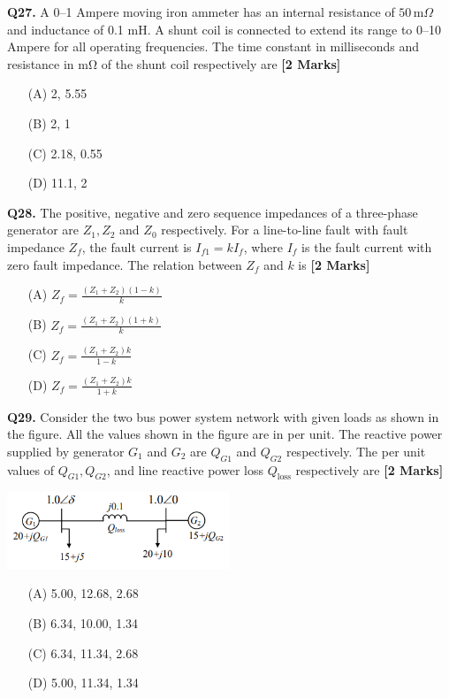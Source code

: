 \documentclass[11pt]{article}
\newcommand{\questionb}[2]{
    \noindent\textbf{Q#2.} #1 \hfill \textbf{[2 Marks]}
}
\begin{document}
\questionb{A 0–1 Ampere moving iron ammeter has an internal resistance of \( 50 \, \text{m}\Omega \) and inductance of 0.1 mH. A shunt coil is connected to extend its range to 0–10 Ampere for all operating frequencies. The time constant in milliseconds and resistance in mΩ of the shunt coil respectively are}{27}
\begin{enumerate}
    \item[(A)] 2, 5.55
    \item[(B)] 2, 1
    \item[(C)] 2.18, 0.55
    \item[(D)] 11.1, 2
\end{enumerate}
\vspace{0.5cm}

\questionb{The positive, negative and zero sequence impedances of a three-phase generator are \( Z_1, Z_2 \) and \( Z_0 \) respectively. For a line-to-line fault with fault impedance \( Z_f \), the fault current is \( I_{f1} = k I_f \), where \( I_f \) is the fault current with zero fault impedance. The relation between \( Z_f \) and \( k \) is}{28}
\begin{enumerate}
    \item[(A)] \( Z_f = \frac{(Z_1 + Z_2)(1 - k)}{k} \)
    \item[(B)] \( Z_f = \frac{(Z_1 + Z_2)(1 + k)}{k} \)
    \item[(C)] \( Z_f = \frac{(Z_1 + Z_2)k}{1 - k} \)
    \item[(D)] \( Z_f = \frac{(Z_1 + Z_2)k}{1 + k} \)
\end{enumerate}
\vspace{0.5cm}

\questionb{Consider the two bus power system network with given loads as shown in the figure. All the values shown in the figure are in per unit. The reactive power supplied by generator \( G_1 \) and \( G_2 \) are \( Q_{G1} \) and \( Q_{G2} \) respectively. The per unit values of \( Q_{G1}, Q_{G2} \), and line reactive power loss \( Q_{\text{loss}} \) respectively are}{29}
\begin{center}
\includegraphics[width=0.5\textwidth]{figures/29.png}
\end{center}
\begin{enumerate}
    \item[(A)] 5.00, 12.68, 2.68
    \item[(B)] 6.34, 10.00, 1.34
    \item[(C)] 6.34, 11.34, 2.68
    \item[(D)] 5.00, 11.34, 1.34
\end{enumerate}
\vspace{0.5cm}
\end{document}
